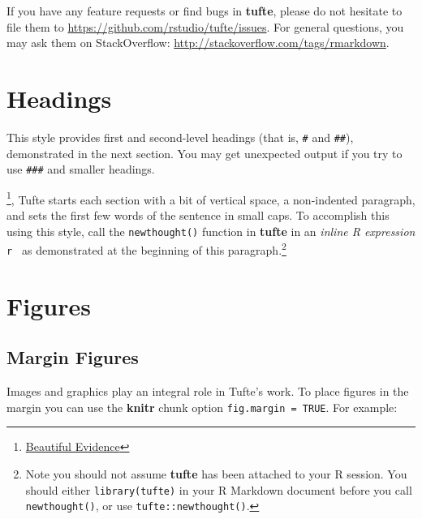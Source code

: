 \documentclass[]{tufte-handout}
\newenvironment{Shaded}{}{}
\newcommand{\KeywordTok}[1]{\textcolor[rgb]{0.00,0.44,0.13}{\textbf{#1}}}
\newcommand{\DataTypeTok}[1]{\textcolor[rgb]{0.56,0.13,0.00}{#1}}
\newcommand{\StringTok}[1]{\textcolor[rgb]{0.25,0.44,0.63}{#1}}
\newcommand{\OperatorTok}[1]{\textcolor[rgb]{0.40,0.40,0.40}{#1}}
\newcommand{\NormalTok}[1]{#1}
\begin{document}
If you have any feature requests or find bugs in \textbf{tufte}, please
do not hesitate to file them to
\url{https://github.com/rstudio/tufte/issues}. For general questions,
you may ask them on StackOverflow:
\url{http://stackoverflow.com/tags/rmarkdown}.

\section{Headings}\label{headings}

This style provides first and second-level headings (that is,
\texttt{\#} and \texttt{\#\#}), demonstrated in the next section. You
may get unexpected output if you try to use \texttt{\#\#\#} and smaller
headings.

\footnote{\href{http://www.edwardtufte.com/tufte/books_be}{Beautiful
  Evidence}}, Tufte starts each section with a bit of vertical space, a
non-indented paragraph, and sets the first few words of the sentence in
small caps. To accomplish this using this style, call the
\texttt{newthought()} function in \textbf{tufte} in an \emph{inline R
expression} \texttt{\textasciigrave{}r\ \textasciigrave{}} as
demonstrated at the beginning of this paragraph.\footnote{Note you
  should not assume \textbf{tufte} has been attached to your R session.
  You should either \texttt{library(tufte)} in your R Markdown document
  before you call \texttt{newthought()}, or use
  \texttt{tufte::newthought()}.}

\section{Figures}\label{figures}

\subsection{Margin Figures}\label{margin-figures}

Images and graphics play an integral role in Tufte's work. To place
figures in the margin you can use the \textbf{knitr} chunk option
\texttt{fig.margin\ =\ TRUE}. For example:

\begin{Shaded}
\end{Shaded}
\end{document}
